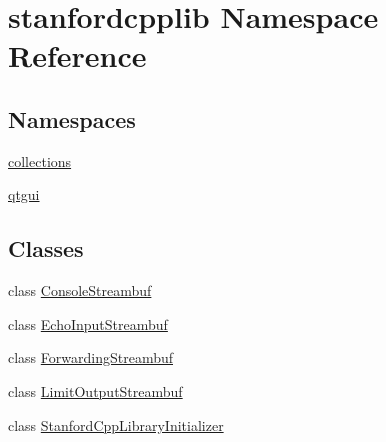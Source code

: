 \hypertarget{namespacestanfordcpplib}{}\section{stanfordcpplib Namespace Reference}
\label{namespacestanfordcpplib}
\subsection*{Namespaces}
\begin{DoxyCompactItemize}
\item 
 \mbox{\hyperlink{namespacestanfordcpplib_1_1collections}{collections}}
\item 
 \mbox{\hyperlink{namespacestanfordcpplib_1_1qtgui}{qtgui}}
\end{DoxyCompactItemize}
\subsection*{Classes}
\begin{DoxyCompactItemize}
\item 
class \mbox{\hyperlink{classstanfordcpplib_1_1ConsoleStreambuf}{Console\+Streambuf}}
\item 
class \mbox{\hyperlink{classstanfordcpplib_1_1EchoInputStreambuf}{Echo\+Input\+Streambuf}}
\item 
class \mbox{\hyperlink{classstanfordcpplib_1_1ForwardingStreambuf}{Forwarding\+Streambuf}}
\item 
class \mbox{\hyperlink{classstanfordcpplib_1_1LimitOutputStreambuf}{Limit\+Output\+Streambuf}}
\item 
class \mbox{\hyperlink{classstanfordcpplib_1_1StanfordCppLibraryInitializer}{Stanford\+Cpp\+Library\+Initializer}}
\end{DoxyCompactItemize}

